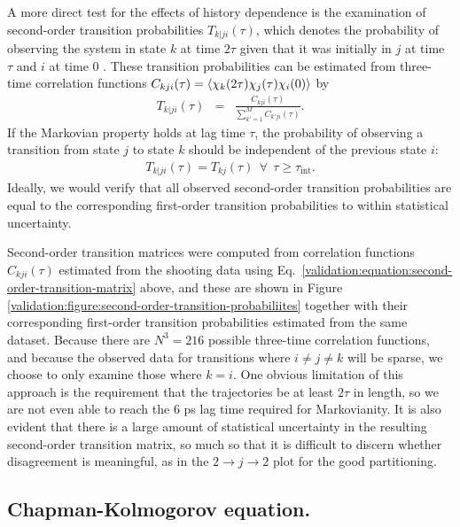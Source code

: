 A more direct test for the effects of history dependence is the examination of second-order transition probabilities $T_{k|ji}(\tau)$, which denotes the probability of observing the system in state $k$ at time $2\tau$ given that it was initially in $j$ at time $\tau$ and $i$ at time $0$ \cite{swope:2004a}.
These transition probabilities can be estimated from three-time correlation functions $C_{kji}(\tau) = \langle \chi_k(2\tau) \chi_j(\tau) \chi_i(0) \rangle$ by
\begin{eqnarray}
T_{k|ji}(\tau) &=& \frac{C_{kji}(\tau)}{\sum\limits_{k'=1}^M C_{k'ji}(\tau)} . \label{validation:equation:second-order-transition-matrix}
\end{eqnarray}
If the Markovian property holds at lag time $\tau$, the probability of observing a transition from state $j$ to state $k$ should be independent of the previous state $i$:
\begin{eqnarray}
T_{k|ji}(\tau) = T_{kj}(\tau) \:\:\forall\:\: \tau \ge \tau_\mathrm{int} .
\end{eqnarray}
Ideally, we would verify that all observed second-order transition probabilities are equal to the corresponding first-order transition probabilities to within statistical uncertainty.

Second-order transition matrices were computed from correlation functions $C_{kji}(\tau)$ estimated from the shooting data using Eq.\ \ref{validation:equation:second-order-transition-matrix} above, and these are shown in Figure \ref{validation:figure:second-order-transition-probabiliites} together with their corresponding first-order transition probabilities estimated from the same dataset.
Because there are $N^3 = 216$ possible three-time correlation functions, and because the observed data for transitions where $i \ne j \ne k$ will be sparse, we choose to only examine those where $k = i$. 
One obvious limitation of this approach is the requirement that the trajectories be at least $2\tau$ in length, so we are not even able to reach the 6 ps lag time required for Markovianity.
It is also evident that there is a large amount of statistical uncertainty in the resulting second-order transition matrix, so much so that it is difficult to discern whether disagreement is meaningful, as in the $2\rightarrow j\rightarrow 2$ plot for the good partitioning.

\subsection{Chapman-Kolmogorov equation.}
\label{validation:section:chapman-kolmogorov-test}

